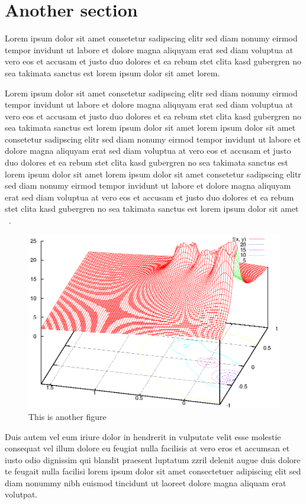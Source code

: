 \section{Another section}

Lorem ipsum dolor sit amet consetetur sadipscing elitr sed diam
nonumy eirmod tempor invidunt ut labore et dolore magna aliquyam
erat sed diam voluptua at vero eos et accusam et justo duo dolores
et ea rebum stet clita kasd gubergren no sea takimata sanctus est
lorem ipsum dolor sit amet lorem.~\cite{XIAOAPL05}

Lorem ipsum dolor sit amet consetetur sadipscing elitr sed diam
nonumy eirmod tempor invidunt ut labore et dolore magna aliquyam
erat sed diam voluptua at vero eos et accusam et justo duo dolores
et ea rebum stet clita kasd gubergren no sea takimata sanctus est
lorem ipsum dolor sit amet lorem ipsum dolor sit amet consetetur
sadipscing elitr sed diam nonumy eirmod tempor invidunt ut labore
et dolore magna aliquyam erat sed diam voluptua at vero eos et
accusam et justo duo dolores et ea rebum stet clita kasd gubergren
no sea takimata sanctus est lorem ipsum dolor sit amet lorem ipsum
dolor sit amet consetetur sadipscing elitr sed diam nonumy eirmod
tempor invidunt ut labore et dolore magna aliquyam erat sed diam
voluptua at vero eos et accusam et justo duo dolores et ea rebum
stet clita kasd gubergren no sea takimata sanctus est lorem ipsum
dolor sit amet ~.

\begin{figure}[htb]
\centering\includegraphics[width=.75\textwidth]{figuras/exemplo1.eps}
\caption{\label{fig:fig2}This is another figure}
\end{figure}

Duis autem vel eum iriure dolor in hendrerit in vulputate velit
esse molestie consequat vel illum dolore eu feugiat nulla
facilisis at vero eros et accumsan et iusto odio dignissim qui
blandit praesent luptatum zzril delenit augue duis dolore te
feugait nulla facilisi lorem ipsum dolor sit amet consectetuer
adipiscing elit sed diam nonummy nibh euismod tincidunt ut laoreet
dolore magna aliquam erat volutpat.

